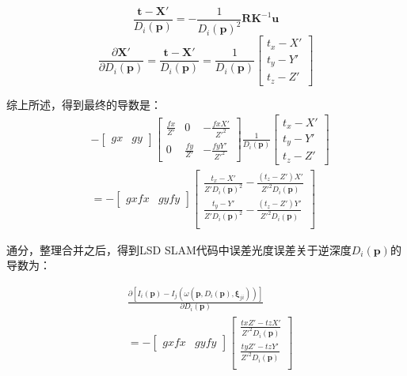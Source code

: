 \begin{equation}
\frac{\bm{t} -\bm{X}'}{D_i(\bm{p})} = -\frac{1}{D_i(\bm{p})^2} \bm{R} \bm{K}^{-1}\bm{u}
\end{equation}
\begin{equation}
		\frac{\partial \bm{X}'}{\partial D_i(\bm{p})} = \frac{\bm{t} -\bm{X}'}{D_i(\bm{p})}
		= 
		\frac{1}{D_i(\bm{p})}
		\left[
			\begin{array}{c}
				t_x - X' \\
				t_y - Y' \\
				t_z - Z'
			\end{array}
		\right]
\end{equation}



综上所述，得到最终的导数是：
\begin{equation}
\begin{split}
	&-\left[
		\begin{array}{cc}
			gx & gy
		\end{array}
	\right]
	\left[ 
		\begin{array}{ccc}
			\frac{fx}{Z'} & 0 & -\frac{fxX'}{Z'^2} \\
			0 & \frac{fy}{Z'} & -\frac{fyY'}{Z'^2} 
		\end{array}
	\right]		
	\frac{1}{D_i(\bm{p})}
	\left[
		\begin{array}{c}
			t_x - X' \\
			t_y - Y' \\
			t_z - Z'
		\end{array}
	\right] \\
	&=
	-\left[
		\begin{array}{cc}
			gx fx &	gy fy
		\end{array} 
	\right]
	\left[ 
		\begin{array}{c}
			\frac{t_x - X'}{Z'D_i(\bm{p})^2}- \frac{(t_z - Z')X'}{Z'^2 D_i(\bm{p})}\\
			\frac{t_y - Y'}{Z'D_i(\bm{p})^2}- \frac{(t_z - Z')Y'}{Z'^2 D_i(\bm{p})}\\
		\end{array}
	\right]
\end{split}
\end{equation}


通分，整理合并之后，得到LSD SLAM代码中误差光度误差关于逆深度$D_i(\bm{p})$的导数为：

\begin{equation}
\begin{split}
&\frac{\partial [I_i(\bm{p}) - I_j(\omega(\bm{p}, D_i(\bm{p}), \bm{\xi}_{ji}))]}{\partial D_i(\bm{p})} \\
&=
-\left[
\begin{array}{cc}
gx fx & gy fy
\end{array} 
\right]
\left[ 
\begin{array}{c}
\frac{txZ' - tzX'}{Z'^2D_i(\bm{p})}\\
\frac{tyZ' - tzY'}{Z'^2D_i(\bm{p})}\\
\end{array} 
\right]
\end{split}
\end{equation}




